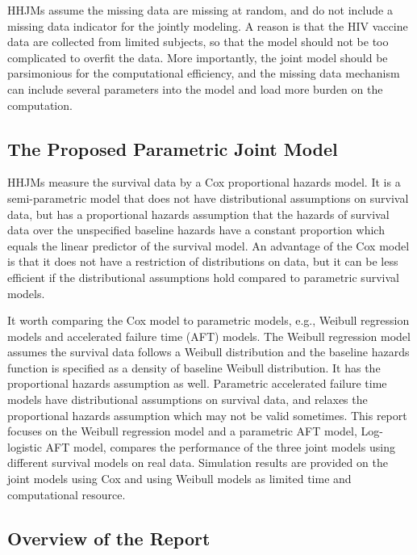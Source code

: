 HHJMs assume the missing data are missing at random, and do not include a missing data indicator for the jointly modeling. 
A reason is that the HIV vaccine data are collected from limited subjects, so that the model should not be too complicated to overfit the data. More importantly, the joint model should be parsimonious for the computational efficiency, and the missing data mechanism can include several parameters into the model and load more burden on the computation.



\subsection{The Proposed Parametric Joint Model}

HHJMs measure the survival data by a Cox proportional hazards model. It is a semi-parametric model that does not have distributional assumptions on survival data, but has a proportional hazards assumption that the hazards of survival data over the unspecified baseline hazards have a constant proportion which equals the linear predictor of the survival model. An advantage of the Cox model is that it does not have a restriction of distributions on data, but it can be less efficient if the distributional assumptions hold compared to parametric survival models.

It worth comparing the Cox model to parametric models, e.g., Weibull regression models and accelerated failure time (AFT) models. The Weibull regression model assumes the survival data follows a Weibull distribution and the baseline hazards  function is specified as a density of baseline Weibull distribution. It has the proportional hazards assumption as well. Parametric accelerated failure time models have distributional assumptions on survival data, and relaxes the proportional hazards assumption which may not be valid sometimes. This report focuses on the Weibull regression model and a parametric AFT model, Log-logistic AFT model, compares the performance of the three joint models using different survival models on real data. Simulation results are provided on the joint models using Cox and using Weibull models as limited time and computational resource.


\subsection{Overview of the Report}

